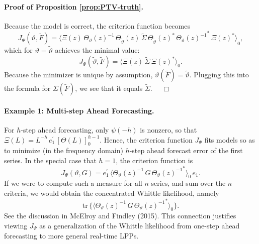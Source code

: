 \documentclass[a4paper]{book}
\begin{document}
\paragraph{Proof of Proposition \ref{prop:PTV-truth}.}
 Because the model is correct, the criterion function becomes
\[
  J_{\Psi} (\vartheta, \widetilde{F}) = { \langle \Xi (z) \, { \Theta_{\vartheta   } (z) }^{-1} \, 
   \Theta_{\widetilde{\vartheta}} (z) \, \widetilde{\Sigma} \, 
  {\Theta_{\widetilde{\vartheta}} (z)  }^* \, { { \Theta_{\vartheta  } (z) }^{-1} }^*
 \, { \Xi (z) }^* \rangle }_0,
\]
 which for $\vartheta = \widetilde{\vartheta}$ achieves the minimal value:
\[
  J_{\Psi} (\widetilde{\vartheta}, \widetilde{F})  ={ \langle \Xi (z) \,   \widetilde{\Sigma} \, 
   { \Xi (z) }^* \rangle }_0.
\]
  Because the minimizer is unique by assumption, $\vartheta (\widetilde{F}) = \widetilde{\vartheta} $. 
  Plugging this into the formula
 for $\Sigma (\widetilde{F})$, we see that it equals $\widetilde{\Sigma}$.  $\quad \Box$

\vspace{.5cm}

\paragraph{Example 1: Multi-step Ahead Forecasting.}   For $h$-step ahead forecasting, only $\psi (-h)$
  is nonzero, so that
 $\Xi (L) =  L^{-h} \,  e_1^{\prime} \, {[ \Theta (L) ]}_0^{ h - 1}$. 
  Hence, the criterion function $J_{\Psi} $ fits models so as to minimize
 (in the frequency domain)  $h$-step ahead forecast error of the first series. 
 In the special case that $h=1$, the criterion function is
\[
 J_{\Psi} (\vartheta, G) =  e_1^{\prime} \, { \langle   { \Theta_{\vartheta   } (z) }^{-1}  \,
  G \, { { \Theta_{\vartheta  } (z) }^{-1} }^*  \rangle }_0 \, e_1.
\]
   If we were to compute such a measure for all $n$ series, and sum over the $n$ criteria, we would obtain the concentrated Whittle 
 likelihood, namely
\[
  \mbox{tr} \, \{  { \langle   { \Theta_{\vartheta   } (z) }^{-1}  \, G \,
  { { \Theta_{\vartheta  } (z) }^{-1} }^*  \rangle }_0 \}.
\]
  See the discussion in McElroy and Findley (2015).  This connection justifies viewing $J_{\Psi}$ as a generalization of the Whittle
 likelihood from one-step ahead forecasting to more general real-time LPPs.

\vspace{.5cm}
\end{document}
